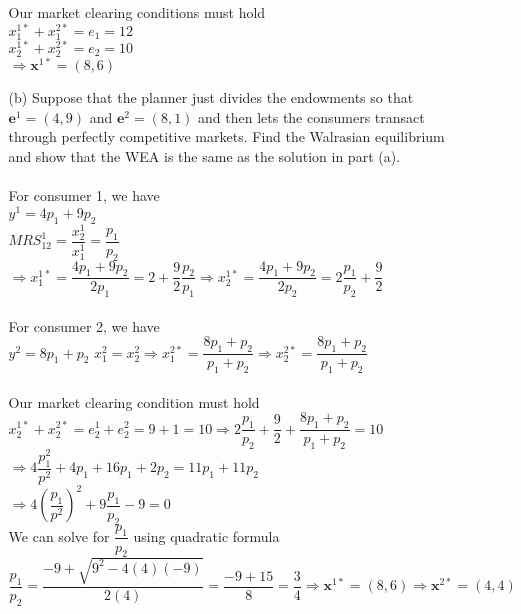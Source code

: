 \documentclass[11pt]{article}
\begin{document}
\begin{enumerate}
\begin{itemize}
	Our market clearing conditions must hold\\
	$x_1^{1*}+x_1^{2*}=e_1=12$\\
	$x_2^{1*}+x_2^{2*}=e_2=10$\\
	$\Rightarrow\textbf{x}^{1*}=(8,6)$\\
	\item[(b)] Suppose that the planner just divides the endowments so that $\mathbf{e}^{1}=(4,9)$ and $\mathbf{e}^{2}=(8,1)$ and then lets the consumers transact through perfectly competitive markets. Find the Walrasian equilibrium and show that the WEA is the same as the solution in part (a).
	\smallskip\\\\
	For consumer 1, we have\\
	$y^1=4p_1+9p_2$\\
	$MRS_{12}^1=\dfrac{x_2^1}{x_1^1}=\dfrac{p_1}{p_2}$
	$\Rightarrow x_1^{1*}=\dfrac{4p_1+9p_2}{2p_1}=2+\dfrac{9}{2}\dfrac{p_2}{p_1}\Rightarrow x_2^{1*}=\dfrac{4p_1+9p_2}{2p_2}=2\dfrac{p_1}{p_2}+\dfrac{9}{2}$\\\\
	For consumer 2, we have\\
	$y^2=8p_1+p_2$
	$x_1^2=x_2^2\Rightarrow x_1^{2*}=\dfrac{8p_1+p_2}{p_1+p_2}\Rightarrow x_2^{2*}=\dfrac{8p_1+p_2}{p_1+p_2}$\\\\
	Our market clearing condition must hold\\
    $x_2^{1*}+x_2^{2*}=e_2^1+e_2^2=9+1=10\Rightarrow2\dfrac{p_1}{p_2}+\dfrac{9}{2}+\dfrac{8p_1+p_2}{p_1+p_2}=10$\\
    $\Rightarrow 4\dfrac{p_1^2}{p^2}+4p_1+16p_1+2p_2=11p_1+11p_2$\\
    $\Rightarrow 4(\dfrac{p_1}{p^2})^2+9\dfrac{p_1}{p_2}-9=0$\\
    We can solve for $\dfrac{p_1}{p_2}$ using quadratic formula\\
	$\dfrac{p_1}{p_2}=\dfrac{-9+\sqrt{9^2-4(4)(-9)}}{2(4)}=\dfrac{-9+15}{8}=\dfrac{3}{4}\Rightarrow\textbf{x}^{1*}=(8,6)\Rightarrow\textbf{x}^{2*}=(4,4)$
	\end{itemize}
\end{enumerate}
\end{document}
